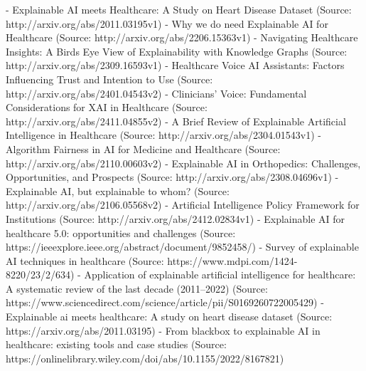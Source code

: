 \documentclass{article}%
\begin{document}
{-} Explainable AI meets Healthcare: A Study on Heart Disease Dataset (Source: http://arxiv.org/abs/2011.03195v1)\newline%
{-} Why we do need Explainable AI for Healthcare (Source: http://arxiv.org/abs/2206.15363v1)\newline%
{-} Navigating Healthcare Insights: A Birds Eye View of Explainability with\newline%
  Knowledge Graphs (Source: http://arxiv.org/abs/2309.16593v1)\newline%
{-} Healthcare Voice AI Assistants: Factors Influencing Trust and Intention\newline%
  to Use (Source: http://arxiv.org/abs/2401.04543v2)\newline%
{-} Clinicians' Voice: Fundamental Considerations for XAI in Healthcare (Source: http://arxiv.org/abs/2411.04855v2)\newline%
{-} A Brief Review of Explainable Artificial Intelligence in Healthcare (Source: http://arxiv.org/abs/2304.01543v1)\newline%
{-} Algorithm Fairness in AI for Medicine and Healthcare (Source: http://arxiv.org/abs/2110.00603v2)\newline%
{-} Explainable AI in Orthopedics: Challenges, Opportunities, and Prospects (Source: http://arxiv.org/abs/2308.04696v1)\newline%
{-} Explainable AI, but explainable to whom? (Source: http://arxiv.org/abs/2106.05568v2)\newline%
{-} Artificial Intelligence Policy Framework for Institutions (Source: http://arxiv.org/abs/2412.02834v1)\newline%
{-} Explainable AI for healthcare 5.0: opportunities and challenges (Source: https://ieeexplore.ieee.org/abstract/document/9852458/)\newline%
{-} Survey of explainable AI techniques in healthcare (Source: https://www.mdpi.com/1424{-}8220/23/2/634)\newline%
{-} Application of explainable artificial intelligence for healthcare: A systematic review of the last decade (2011–2022) (Source: https://www.sciencedirect.com/science/article/pii/S0169260722005429)\newline%
{-} Explainable ai meets healthcare: A study on heart disease dataset (Source: https://arxiv.org/abs/2011.03195)\newline%
{-} From blackbox to explainable AI in healthcare: existing tools and case studies (Source: https://onlinelibrary.wiley.com/doi/abs/10.1155/2022/8167821)\newline%
\end{document}
